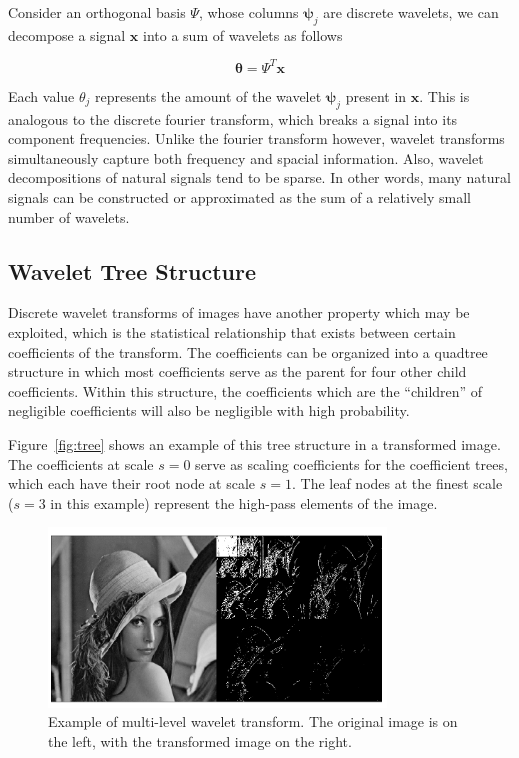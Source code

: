 \documentclass{IEEEtran}
\newcommand{\bfx}{\mathbf{x}}
\newcommand{\bfpsi}{\mathbf{\psi}}
\newcommand{\bftheta}{\mathbf{\theta}}
\begin{document}
Consider an orthogonal basis $\Psi$, whose columns $\bfpsi_j$ are discrete wavelets, we can decompose a signal $\bfx$ into a sum of wavelets as follows

\begin{equation}
  \label{eq:dwt}
  \bftheta = \Psi^T \bfx
\end{equation}

Each value $\theta_j$ represents the amount of the wavelet $\bfpsi_j$ present in $\bfx$. This is analogous to the discrete fourier transform, which breaks a signal into its component frequencies. Unlike the fourier transform however, wavelet transforms simultaneously capture both frequency and spacial information. Also, wavelet decompositions of natural signals tend to be sparse.  In other words, many natural signals can be constructed or approximated as the sum of a relatively small number of wavelets.

\subsection{Wavelet Tree Structure}
Discrete wavelet transforms of images have another property which may be exploited, which is the statistical relationship that exists between certain coefficients of the transform. The coefficients can be organized into a quadtree structure in which most coefficients serve as the parent for four other child coefficients. Within this structure, the coefficients which are the ``children'' of negligible coefficients will also be negligible with high probability.

Figure~\ref{fig:tree} shows an example of this tree structure in a transformed image.  The coefficients at scale $s=0$ serve as scaling coefficients for the coefficient trees, which each have their root node at scale $s=1$. The leaf nodes at the finest scale ($s=3$ in this example) represent the high-pass elements of the image.

\begin{figure}[ht]
  \centering
  \includegraphics[width=0.8\textwidth]{lenna_wavelet}
  \caption{Example of multi-level wavelet transform. The original image is on the left, with the transformed image on the right.}
  \label{fig:lenna}
\end{figure}
\end{document}
